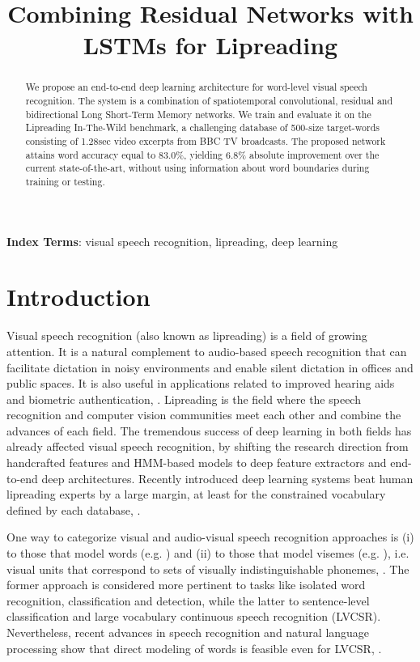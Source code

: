 \documentclass[a4paper]{article}
\title{Combining Residual Networks with LSTMs for Lipreading}
\begin{document}
\maketitle
\begin{abstract}
We propose an end-to-end deep learning architecture for word-level visual speech recognition. The system is a combination of spatiotemporal convolutional, residual and bidirectional Long Short-Term Memory networks. We train and evaluate it on the Lipreading In-The-Wild benchmark, a challenging database of 500-size target-words consisting of 1.28sec video excerpts from BBC TV broadcasts. The proposed network attains word accuracy equal to 83.0\%, yielding 6.8\% absolute improvement over the current state-of-the-art, without using information about word boundaries during training or testing.  
\end{abstract}
\noindent\textbf{Index Terms}: visual speech recognition, lipreading, deep learning

\section{Introduction}

Visual speech recognition (also known as lipreading) is a field of growing attention. It is a natural complement to audio-based speech recognition that can facilitate dictation in noisy environments and enable silent dictation in offices and public spaces. It is also useful in applications related to improved hearing aids and biometric authentication, \cite{assael2016lipnet}. Lipreading is the field where the speech recognition and computer vision communities meet each other and combine the advances of each field. The tremendous success of deep learning in both fields has already affected visual speech recognition, by shifting the research direction from handcrafted features and HMM-based models to deep feature extractors and end-to-end deep architectures. Recently introduced deep learning systems beat human lipreading experts by a large margin, at least for the constrained vocabulary defined by each database,  \cite{assael2016lipnet} \cite{chung2016lipsent}.    

One way to categorize visual and audio-visual speech recognition approaches is (i) to those that model words (e.g. \cite{wand2016lipreading} \cite{chung2016lip}) and (ii) to those that model visemes (e.g. \cite{assael2016lipnet} \cite{chung2016lipsent}), i.e. visual units that correspond to sets of visually indistinguishable phonemes, \cite{fisher1968confusions} \cite{bear2016decoding}. The former approach is considered more pertinent to tasks like isolated word recognition, classification and detection, while the latter to sentence-level classification and large vocabulary continuous speech recognition (LVCSR). Nevertheless, recent advances in speech recognition and natural language processing show that direct modeling of words is feasible even for LVCSR, \cite{bengio2014word} \cite{soltau2016neural} \cite{audhkhasi2017direct}.      
\end{document}
